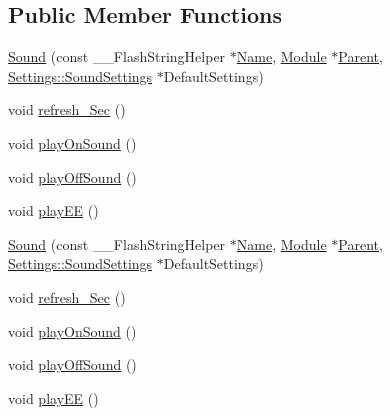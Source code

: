 \subsection*{Public Member Functions}
\begin{DoxyCompactItemize}
\item 
\hyperlink{class_sound_a9432356bb1ba946460c33f286d2b325b}{Sound} (const \+\_\+\+\_\+\+Flash\+String\+Helper $\ast$\hyperlink{class_common_aeea91a726dbe988e515057b32ba0726f}{Name}, \hyperlink{class_module}{Module} $\ast$\hyperlink{class_sound_a34e48159f12d4431e962d80fad71eb02}{Parent}, \hyperlink{struct_settings_1_1_sound_settings}{Settings\+::\+Sound\+Settings} $\ast$Default\+Settings)
\item 
void \hyperlink{class_sound_a747a131af54af0747775b918aa3f7925}{refresh\+\_\+\+Sec} ()
\item 
void \hyperlink{class_sound_a038f9173934d27db8004ded6db667df6}{play\+On\+Sound} ()
\item 
void \hyperlink{class_sound_a53aa4bec2fd464c5149ca30b29b35ac1}{play\+Off\+Sound} ()
\item 
void \hyperlink{class_sound_a887e5a54b6e00d4a33d63feb53017cfc}{play\+EE} ()
\item 
\hyperlink{class_sound_a9432356bb1ba946460c33f286d2b325b}{Sound} (const \+\_\+\+\_\+\+Flash\+String\+Helper $\ast$\hyperlink{class_common_aeea91a726dbe988e515057b32ba0726f}{Name}, \hyperlink{class_module}{Module} $\ast$\hyperlink{class_sound_a34e48159f12d4431e962d80fad71eb02}{Parent}, \hyperlink{struct_settings_1_1_sound_settings}{Settings\+::\+Sound\+Settings} $\ast$Default\+Settings)
\item 
void \hyperlink{class_sound_a747a131af54af0747775b918aa3f7925}{refresh\+\_\+\+Sec} ()
\item 
void \hyperlink{class_sound_a038f9173934d27db8004ded6db667df6}{play\+On\+Sound} ()
\item 
void \hyperlink{class_sound_a53aa4bec2fd464c5149ca30b29b35ac1}{play\+Off\+Sound} ()
\item 
void \hyperlink{class_sound_a887e5a54b6e00d4a33d63feb53017cfc}{play\+EE} ()
\end{DoxyCompactItemize}
